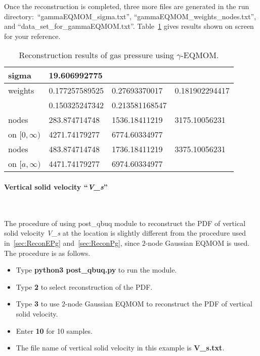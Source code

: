 \documentclass[a4paper,12pt,titlepage]{article}
\begin{document}
Once the reconstruction is completed, three more files are generated in the run
directory:\ ``gammaEQMOM\_sigma.txt'', ``gammaEQMOM\_weights\_nodes.txt'', and
``data\_set\_for\_gammaEQMOM.txt''. Table~\ref{tab:ReconPg} gives results shown
on screen for your reference.

\begin{table}[htp]
 \centering
 \begin{tabular}{l|lll} \hline
  sigma            & \multicolumn{3}{l}{19.606992775}                 \\ \hline
  weights          & 0.177257589525 & 0.27693370017  & 0.181902294417 \\ 
                   & 0.150325247342 & 0.213581168547 &                \\ \hline
  nodes            & 283.874714748  & 1536.18411219  & 3175.10056231  \\
  on $[0, \infty)$ & 4271.74179277  & 6774.60334977  &                \\ \hline
  nodes            & 483.874714748  & 1736.18411219  & 3375.10056231  \\ 
  on $[a, \infty)$ & 4471.74179277  & 6974.60334977  &                \\ \hline
 \end{tabular}
 \caption{Reconstruction results of gas pressure using $\gamma$-EQMOM.}
 \label{tab:ReconPg}
\end{table}

\paragraph{Vertical solid velocity ``\emph{V\_s}''}\mbox{}\\
\label{sec:ReconVs}

The procedure of using post\_qbuq module to reconstruct the PDF of vertical
solid velocity \emph{V\_s} at the location is slightly different from the
procedure used in~\ref{sec:ReconEPg} and~\ref{sec:ReconPg}, since $2$-node
Gaussian EQMOM is used\cite{Chalons2010}. The procedure is as follows.

\begin{itemize}
 \item Type \textbf{python3 post\_qbuq.py} to run the module.
 \item Type \textbf{2} to select reconstruction of the PDF.
 \item Type \textbf{3} to use $2$-node Gaussian EQMOM to reconstruct the PDF of 
 vertical solid velocity.
 \item Enter \textbf{10} for 10 samples.
 \item The file name of vertical solid velocity in this example is 
 \textbf{V\_s.txt}.
\end{itemize}
\end{document}
